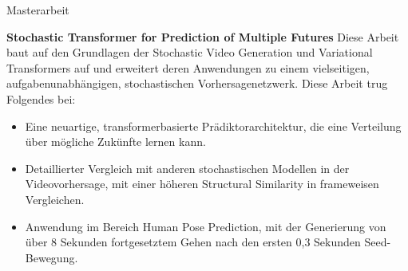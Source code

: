 \begin{rubric}{Masterarbeit}

\entry*[2023]%
\textbf{Stochastic Transformer for Prediction of Multiple Futures}  \newline  
Diese Arbeit baut auf den Grundlagen der Stochastic Video Generation und Variational Transformers auf und erweitert deren Anwendungen zu einem vielseitigen, aufgabenunabhängigen, stochastischen Vorhersagenetzwerk. Diese Arbeit trug Folgendes bei: \newline  
\vspace{\CVItemizeHeaderSpacing} \begin{itemize}
	\setlength{\itemsep}{\CVItemizeSpacing}  
	\item Eine neuartige, transformerbasierte Prädiktorarchitektur, die eine Verteilung über mögliche Zukünfte lernen kann.  
	\item Detaillierter Vergleich mit anderen stochastischen Modellen in der Videovorhersage, mit einer höheren Structural Similarity in frameweisen Vergleichen.  
	\item Anwendung im Bereich Human Pose Prediction, mit der Generierung von über 8 Sekunden fortgesetztem Gehen nach den ersten 0,3 Sekunden Seed-Bewegung.  
\end{itemize}


\end{rubric}